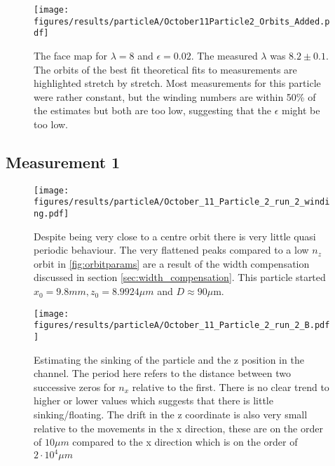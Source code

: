 
%

\begin{figure}[H]
\begin{center}
\texttt{[image: figures/results/particleA/October11Particle2\_Orbits\_Added.pdf]}
\end{center}
\caption{The face map for $\lambda = 8$ and $\epsilon = 0.02$. The measured $\lambda$ was $8.2 \pm 0.1$. The orbits of the best fit theoretical fits to measurements are highlighted stretch by stretch. Most measurements for this particle were rather constant, but the winding numbers are within 50\% of the estimates but both are too low, suggesting that the $\epsilon$ might be too low.}
\label{fig:particleAOrbitFit}
\end{figure}


\subsection{Measurement 1}
\begin{figure}[H]
\begin{center}
\texttt{[image: figures/results/particleA/October\_11\_Particle\_2\_run\_2\_winding.pdf]}
\end{center}
\caption{Despite being very close to a centre orbit there is very little quasi periodic behaviour. The very flattened peaks compared to a low $n_z$ orbit in \ref{fig:orbitparams} are a result of the width compensation discussed in section \ref{sec:width_compensation}. This particle started $x_0 = 9.8 mm, z_0 = 8.9924 \mu m$ and $D \approx 90\mu$m.}
\label{fig:particleA1}
\end{figure}

\begin{figure}[H]
\begin{center}
\texttt{[image: figures/results/particleA/October\_11\_Particle\_2\_run\_2\_B.pdf]}
\end{center}
\caption{Estimating the sinking of the particle and the z position in the channel. The period here refers to the distance between two successive zeros for $n_x$ relative to the first. There is no clear trend to higher or lower values which suggests that there is little sinking/floating. The drift in the z coordinate is also very small relative to the movements in the x direction, these are on the order of $10\mu m$ compared to the x direction which is on the order of $2\cdot 10^4 \mu m$}
\label{fig:particleAsink}
\end{figure}

